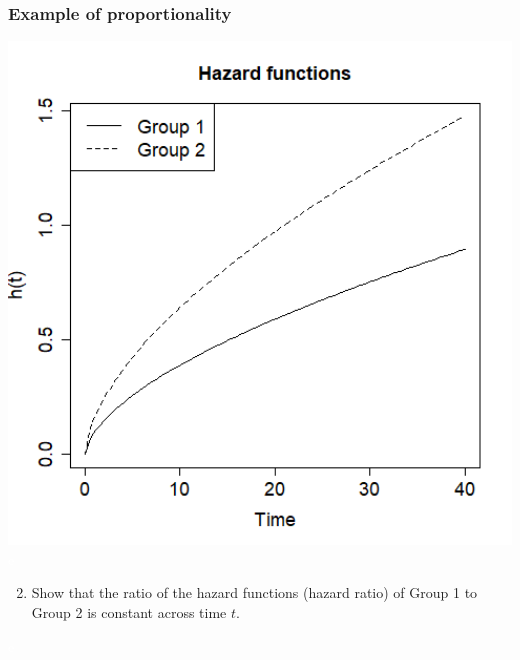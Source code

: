 \begin{frame}
\frametitle{Example of proportionality}
\includegraphics[width=1.0\textwidth]{Figures/prop_haz_groups.png}\\
\vskip30pt
\textcolor{white}{e}
\emp
\blankcolumn
{}
\begin{enumerate}
\setcounter{enumi}{1}
\item Show that the ratio of the hazard functions (hazard ratio) of Group 1 to Group 2 is constant across time $t$.
\end{enumerate}
\vskip200pt
\textcolor{white}{e}
\emp
\end{frame}

